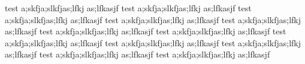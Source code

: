test a;skfja;slkfjas;lfkj as;lfkasjf
test a;skfja;slkfjas;lfkj as;lfkasjf
test a;skfja;slkfjas;lfkj as;lfkasjf
test a;skfja;slkfjas;lfkj as;lfkasjf test a;skfja;slkfjas;lfkj as;lfkasjf test a;skfja;slkfjas;lfkj as;lfkasjf
test a;skfja;slkfjas;lfkj as;lfkasjf
test a;skfja;slkfjas;lfkj as;lfkasjf
test a;skfja;slkfjas;lfkj as;lfkasjf
test a;skfja;slkfjas;lfkj as;lfkasjf test a;skfja;slkfjas;lfkj as;lfkasjf test a;skfja;slkfjas;lfkj as;lfkasjf

